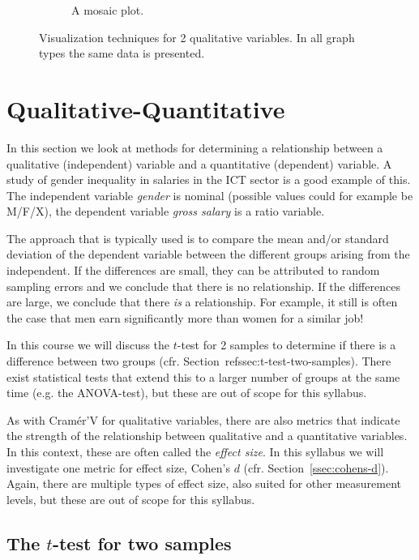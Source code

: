 \begin{figure}
\begin{subfigure}{.33\textwidth}
    \caption{A mosaic plot.}
    \label{fig:mosaic-plot}
  \end{subfigure}
  \caption[Visualization techniques for 2 qualitative variables]{Visualization techniques for 2 qualitative variables. In all graph types the same data is presented.}
\end{figure}


\section{Qualitative-Quantitative}
\label{sec:qualitative-quantitative}

In this section we look at methods for determining a relationship between a qualitative (independent) variable and a quantitative (dependent) variable. A study of gender inequality in salaries in the ICT sector is a good example of this. The independent variable \emph{gender} is nominal (possible values could for example be M/F/X), the dependent variable \emph{gross salary} is a ratio variable.

The approach that is typically used is to compare the mean and/or standard deviation of the dependent variable between the different groups arising from the independent. If the differences are small, they can be attributed to random sampling errors and we conclude that there is no relationship. If the differences are large, we conclude that there \emph{is} a relationship. For example, it still is often the case that men earn significantly more than women for a similar job!

In this course we will discuss the $t$-test for 2 samples to determine if there is a difference between two groups (cfr. Section~ref{ssec:t-test-two-samples}). There exist statistical tests that extend this to a larger number of groups at the same time (e.g. the ANOVA-test), but these are out of scope for this syllabus.

As with Cramér'V for qualitative variables, there are also metrics that indicate the strength of the relationship between qualitative and a quantitative variables. In this context, these are often called the \emph{effect size}. In this syllabus we will investigate one metric for effect size, Cohen's $d$ (cfr. Section~\ref{ssec:cohens-d}). Again, there are multiple types of effect size, also suited for other measurement levels, but these are out of scope for this syllabus.

\subsection{The \texorpdfstring{$t$}{t}-test for two samples}
\label{ssec:t-test-two-samples}

